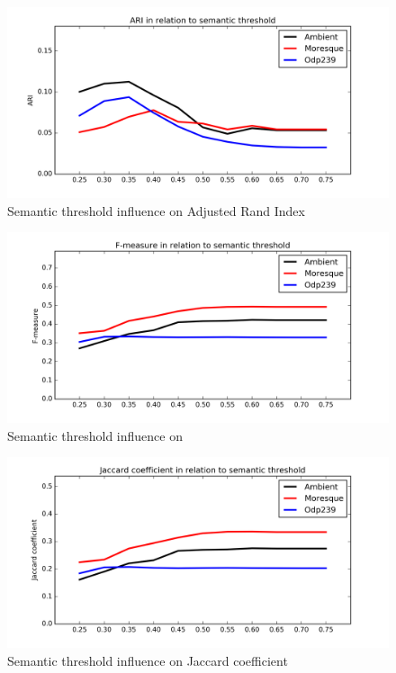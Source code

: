 \documentclass[a4paper, 12pt, oneside]{Thesis} %
\begin{document}
\begin{figure}[h]
  \centering
  \includegraphics[width=1.0\linewidth]{Figures/sem_threshold_reult_ARI.png}
  \caption{Semantic threshold influence on Adjusted Rand Index}
  \label{fig:semparamfig2}
\end{figure}

\begin{figure}[h]
  \centering
  \includegraphics[width=1.0\linewidth]{Figures/sem_threshold_reult_F-measure-classic.png}
  \caption{Semantic threshold influence on }
  \label{fig:semparamfig3}
\end{figure}

\begin{figure}[h]
  \centering
  \includegraphics[width=1.0\linewidth]{Figures/sem_threshold_reult_Jaccard.png}
  \caption{Semantic threshold influence on Jaccard coefficient}
  \label{fig:semparamfig4}
\end{figure}
\end{document}
